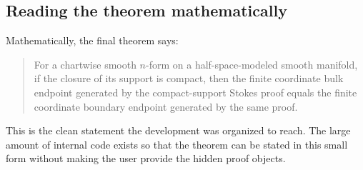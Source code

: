 \subsection{Reading the theorem mathematically}

Mathematically, the final theorem says:

\begin{quote}
For a chartwise smooth \(n\)-form on a half-space-modeled smooth manifold, if
the closure of its support is compact, then the finite coordinate bulk endpoint
generated by the compact-support Stokes proof equals the finite coordinate
boundary endpoint generated by the same proof.
\end{quote}

This is the clean statement the development was organized to reach.  The
large amount of internal code exists so that the theorem can be stated in this
small form without making the user provide the hidden proof objects.
